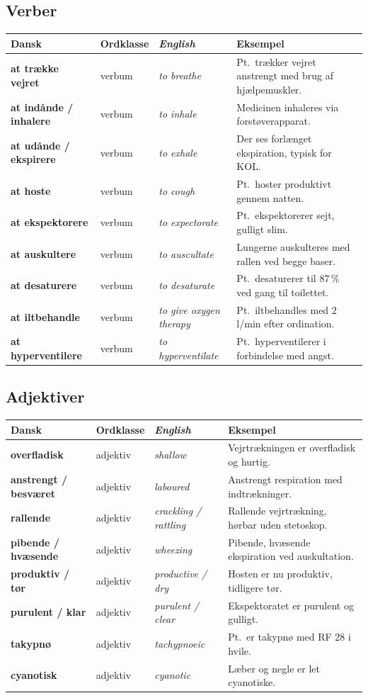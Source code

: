 \documentclass[11pt,a4paper]{report}
\makeatletter
\newcommand{\eng}[1]{\textcolor{en}{\itshape #1}}       %
\newcommand{\da}[1]{\textbf{#1}}
\newenvironment{glos}{%
  \small\renewcommand{\arraystretch}{1.35}
  \begin{longtable}{@{}>{\raggedright\arraybackslash}p{3.3cm}
                        >{\raggedright\arraybackslash}p{1.7cm}
                        >{\raggedright\arraybackslash}p{3.2cm}
                        >{\raggedright\arraybackslash}p{6.0cm}@{}}
  \toprule
  \textbf{Dansk} & \textbf{Ordklasse} & \eng{English} & \textbf{Eksempel} \\ \midrule
  \endhead
}{\bottomrule\end{longtable}}
\makeatother
\begin{document}
\subsection{Verber}
\begin{glos}
\da{at trække vejret} & verbum & \eng{to breathe} & Pt.\ trækker vejret anstrengt med brug af hjælpemuskler. \\
\da{at indånde / inhalere} & verbum & \eng{to inhale} & Medicinen inhaleres via forstøverapparat. \\
\da{at udånde / ekspirere} & verbum & \eng{to exhale} & Der ses forlænget ekspiration, typisk for KOL. \\
\da{at hoste} & verbum & \eng{to cough} & Pt.\ hoster produktivt gennem natten. \\
\da{at ekspektorere} & verbum & \eng{to expectorate} & Pt.\ ekspektorerer sejt, gulligt slim. \\
\da{at auskultere} & verbum & \eng{to auscultate} & Lungerne auskulteres med rallen ved begge baser. \\
\da{at desaturere} & verbum & \eng{to desaturate} & Pt.\ desaturerer til 87\,\% ved gang til toilettet. \\
\da{at iltbehandle} & verbum & \eng{to give oxygen therapy} & Pt.\ iltbehandles med 2 l/min efter ordination. \\
\da{at hyperventilere} & verbum & \eng{to hyperventilate} & Pt.\ hyperventilerer i forbindelse med angst. \\
\end{glos}

\subsection{Adjektiver}
\begin{glos}
\da{overfladisk} & adjektiv & \eng{shallow} & Vejrtrækningen er overfladisk og hurtig. \\
\da{anstrengt / besværet} & adjektiv & \eng{laboured} & Anstrengt respiration med indtrækninger. \\
\da{rallende} & adjektiv & \eng{crackling / rattling} & Rallende vejrtrækning, hørbar uden stetoskop. \\
\da{pibende / hvæsende} & adjektiv & \eng{wheezing} & Pibende, hvæsende ekspiration ved auskultation. \\
\da{produktiv / tør} & adjektiv & \eng{productive / dry} & Hosten er nu produktiv, tidligere tør. \\
\da{purulent / klar} & adjektiv & \eng{purulent / clear} & Ekspektoratet er purulent og gulligt. \\
\da{takypnø} & adjektiv & \eng{tachypnoeic} & Pt.\ er takypnø med RF 28 i hvile. \\
\da{cyanotisk} & adjektiv & \eng{cyanotic} & Læber og negle er let cyanotiske. \\
\end{glos}
\end{document}
